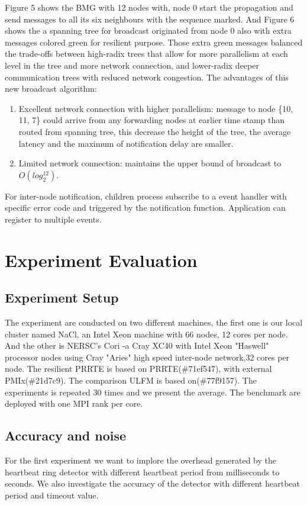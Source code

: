 \documentclass[sigconf]{acmart}
\begin{document}
Figure 5 shows the BMG with 12 nodes with, node 0 start the propagation and send messages to all its six neighbours with the sequence marked. And Figure 6 shows the a spanning tree for broadcast originated from node 0 also with extra messages colored green for resilient purpose. Those extra green messages balanced the trade-offs between high-radix trees that allow for more parallelism at each level in the tree and more network connection, and lower-radix deeper communication trees with reduced network congestion. The advantages of this new broadcast algorithm:
\begin{enumerate}
  \item Excellent network connection with higher parallelism: message to node \{10, 11, 7\} could arrive from any forwarding nodes at earlier time stamp than routed from spanning tree, this decrease the height of the tree, the average latency and the maximum of notification delay are smaller.
  \item Limited network connection: maintains the upper bound of broadcast to $O(log_2^{12})$. 
\end{enumerate}
For inter-node notification, children process subscribe to a event handler with specific error code and triggered by the notification function. 
Application can register to multiple events.

\section{Experiment Evaluation}

\subsection{Experiment Setup}
The experiment are conducted on two different machines, the first one is our local cluster named NaCl, an Intel Xeon machine with 66 nodes, 12 cores per node. And the other is NERSC's Cori\cite{Cori01} -a Cray XC40 with Intel Xeon "Haswell" processor nodes using Cray "Aries" high speed inter-node network,32 cores per node. The resilient PRRTE is based on PRRTE(\#71ef547), with external PMIx(\#21d7c9). The comparison ULFM is based on(\#77f9157). The experiments is repeated 30 times and we present the average. The benchmark are deployed with one MPI rank per core. 
\subsection{Accuracy and noise}
For the first experiment we want to implore the overhead generated by the heartbeat ring detector with different heartbeat period from milliseconds to seconds. We also investigate the accuracy of the detector with different heartbeat period and timeout value. 
\end{document}
